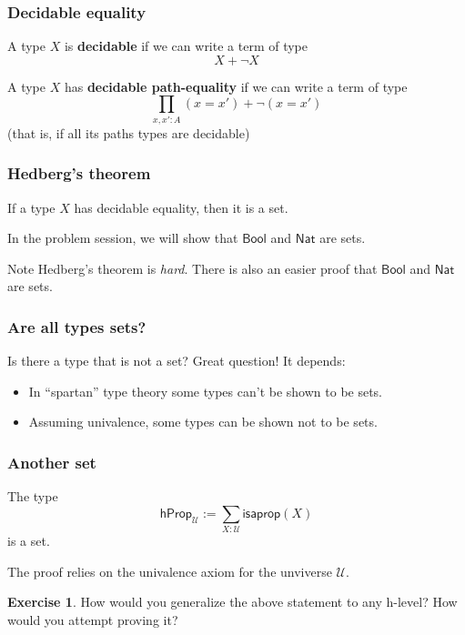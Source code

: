 \documentclass{beamer}
\newcommand{\fat}[1]{\textbf{#1}}
\newcommand{\constfont}[1]{\ensuremath{\mathsf{#1}}}
\newcommand{\U}{\mathcal{U}}
\newcommand{\Nat}{\constfont{Nat}}
\newcommand{\Bool}{\constfont{Bool}}
\newcommand{\hProp}{\constfont{hProp}}
\newcommand{\isaprop}{\constfont{isaprop}}
\theoremstyle{definition}
\newtheorem{exercise}{Exercise}
\begin{document}
\begin{frame}
 \frametitle{Decidable equality}

    \begin{definition}
     A type $X$ is \fat{decidable} if we can write a term of type
     \[     X + \neg X \]
    \end{definition}

    \begin{definition}
     A type $X$ has \fat{decidable path-equality} if we can write a term of type
     \[  \prod_{x, x' : A} (x = x') + \neg(x=x') \]
     (that is, if all its paths types are decidable)
    \end{definition}

\end{frame}

\begin{frame}
  \frametitle{Hedberg's theorem}

  \begin{theorem}
   If a type $X$ has decidable equality, then it is a set.
  \end{theorem}

  In the problem session, we will show that $\Bool$ and $\Nat$ are sets.
  \pause
  \begin{block}{Note}
    Hedberg's theorem is \emph{hard}. There is also an easier proof that $\Bool$ and $\Nat$ are sets.
  \end{block}

\end{frame}

\begin{frame}
 \frametitle{Are all types sets?}
  \begin{block}{Is there a type that is not a set?}
    Great question! It depends:

    \begin{itemize}
     \item In ``spartan'' type theory some types can't be shown to be sets.
     \item Assuming univalence, some types can be shown not to be sets.
    \end{itemize}
  \end{block}
\end{frame}


\begin{frame}
 \frametitle{Another set}

  \begin{theorem}
    The type
     \[  \hProp_\U := \sum_{X : \U} \isaprop(X) \]
    is a set.
  \end{theorem}

  The proof relies on the univalence axiom for the unviverse $\U$.


  \begin{exercise}
    How would you generalize the above statement to any h-level?
    How would you attempt proving it?
  \end{exercise}

\end{frame}
\end{document}
